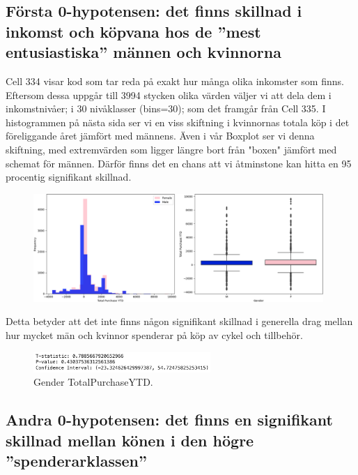 \documentclass[]{article}
\begin{document}
\subsection{Första 0-hypotensen: det finns skillnad i inkomst och köpvana hos de ''mest entusiastiska'' männen och kvinnorna}

Cell 334 visar kod som tar reda på exakt hur många olika inkomster som finns. Eftersom dessa uppgår till 3994 stycken olika värden väljer vi att dela dem i inkomstnivåer; i 30 nivåklasser (bins=30); som det framgår från Cell 335. I histogrammen på nästa sida ser vi en viss skiftning i kvinnornas totala köp i det föreliggande året jämfört med männens. Även i vår Boxplot ser vi denna skiftning, med extremvärden som ligger längre bort från "boxen" jämfört med schemat för männen. Därför finns det en chans att vi åtminstone kan hitta en 95 procentig signifikant skillnad.
\begin{figure}[h]
    \centering
    \includegraphics[width=0.98\textwidth]{img_boxplot.png}
\end{figure}
Detta betyder att det inte finns någon signifikant skillnad i generella drag mellan hur mycket män och kvinnor spenderar på köp av cykel och tillbehör.
\begin{figure}[h]
    \centering
    \includegraphics[width=0.6\textwidth]{img_gender_total_purchase_ytd.png}
    \caption{Gender TotalPurchaseYTD.}
\end{figure}








\subsection{Andra 0-hypotensen: det finns en signifikant skillnad mellan könen i den högre ''spenderarklassen''}
\end{document}
